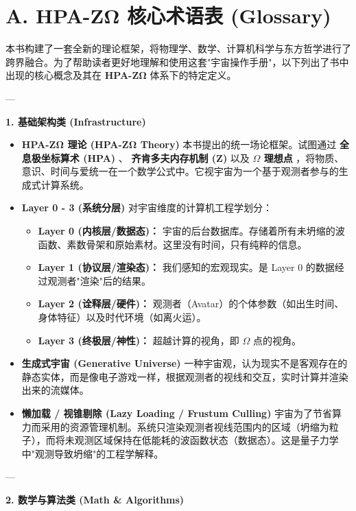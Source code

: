 \section*{A. HPA-ZΩ 核心术语表 (Glossary)}

本书构建了一套全新的理论框架，将物理学、数学、计算机科学与东方哲学进行了跨界融合。为了帮助读者更好地理解和使用这套"宇宙操作手册"，以下列出了书中出现的核心概念及其在 \textbf{HPA-ZΩ} 体系下的特定定义。

---

\textbf{1. 基础架构类 (Infrastructure)}

\begin{itemize}
\item \textbf{HPA-ZΩ 理论 (HPA-ZΩ Theory)}
本书提出的统一场论框架。试图通过 \textbf{全息极坐标算术 (HPA)} 、 \textbf{齐肯多夫内存机制 (Z)} 以及 \textbf{$\Omega$ 理想点} ，将物质、意识、时间与爱统一在一个数学公式中。它视宇宙为一个基于观测者参与的生成式计算系统。
\item \textbf{Layer 0 - 3 (系统分层)}
对宇宙维度的计算机工程学划分：
\begin{itemize}
\item \textbf{Layer 0 (内核层/数据态)：} 宇宙的后台数据库。存储着所有未坍缩的波函数、素数骨架和原始素材。这里没有时间，只有纯粹的信息。
\item \textbf{Layer 1 (协议层/渲染态)：} 我们感知的宏观现实。是 Layer 0 的数据经过观测者"渲染"后的结果。
\item \textbf{Layer 2 (诠释层/硬件)：} 观测者（Avatar）的个体参数（如出生时间、身体特征）以及时代环境（如离火运）。
\item \textbf{Layer 3 (终极层/神性)：} 超越计算的视角，即 $\Omega$ 点的视角。
\end{itemize}
\item \textbf{生成式宇宙 (Generative Universe)}
一种宇宙观，认为现实不是客观存在的静态实体，而是像电子游戏一样，根据观测者的视线和交互，实时计算并渲染出来的流媒体。
\item \textbf{懒加载 / 视锥剔除 (Lazy Loading / Frustum Culling)}
宇宙为了节省算力而采用的资源管理机制。系统只渲染观测者视线范围内的区域（坍缩为粒子），而将未观测区域保持在低能耗的波函数状态（数据态）。这是量子力学中"观测导致坍缩"的工程学解释。
\end{itemize}

---

\textbf{2. 数学与算法类 (Math \& Algorithms)}

